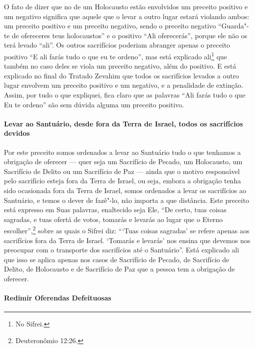 \begin{multicols}{2}
O fato de dizer que no de um Holocausto estão envolvidos um preceito
positivo e um negativo significa que aquele que o levar a outro lugar
estará violando ambos: um preceito positivo e um preceito negativo,
sendo o preceito negativo ``Guarda"-te de ofereceres teus holocaustos'' e
o positivo ``Ali oferecerás'', porque ele não os terá levado ``ali''. Os outros
sacrifícios poderiam abranger apenas o preceito positivo ``E ali farás tudo o que eu te
ordeno'', mas está explicado ali\footnote{No Sifrei\starr.} que também no caso deles se
viola um preceito negativo, além do positivo. E está explicado no final do Tratado Zevahim\starr{} que todos
os sacrifícios levados a outro lugar envolvem um preceito positivo e um
negativo, e a penalidade de extinção. Assim, por
tudo o que expliquei, fica claro que as palavras ``Ali farás tudo o que
Eu te ordeno'' são sem dúvida alguma um preceito positivo.

\paragraph{Levar ao Santuário, desde fora da Terra de Israel, todos os sacrifícios devidos}

Por este preceito somos ordenados a levar ao Santuário tudo o que
tenhamos a obrigação de oferecer --- quer seja um Sacrifício de Pecado,
um Holocausto, um Sacrifício de Delito ou um Sacrifício de Paz --- ainda
que o motivo responsável pelo sacrifício esteja fora da Terra de
Israel, ou seja, embora a obrigação tenha sido ocasionada fora da Terra
de Israel, somos ordenados a levar os sacrifícios ao Santuário, e temos
o dever de fazê"-lo, não importa a que distância. Este preceito está
expresso em Suas palavras, enaltecido seja Ele, ``De certo, tuas coisas
sagradas, e tuas ofertá de votos, tomarás e levarás ao lugar que o
Eterno escolher'',\footnote{Deuteronômio 12:26.} sobre as quais o Sifrei\starr{} diz:
```Tuas coisas sagradas' se refere apenas aos sacrifícios fora da Terra
de Israel. `Tomarás e levarás' nos ensina que devemos nos preocupar com
o transporte dos sacrifícios até o Santuário''. Está explicado ali que
isso se aplica apenas nos casos de Sacrifício de Pecado, de Sacrifício
de Delito, de Holocausto e de Sacrifício de Paz que a pessoa tem a
obrigação de oferecer.

\paragraph{Redimir Oferendas Defeituosas}


\end{multicols}
